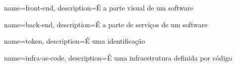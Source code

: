 \makeglossaries

 {
    name=front-end,
    description={É a parte visual de um software}
}

 {
    name=back-end,
    description={É a parte de serviços de um software}
}


 {
    name=token,
    description={É uma identificação}
}

 {
    name=infra-as-code,
    description={É uma infraestrutura definida por código}
}





